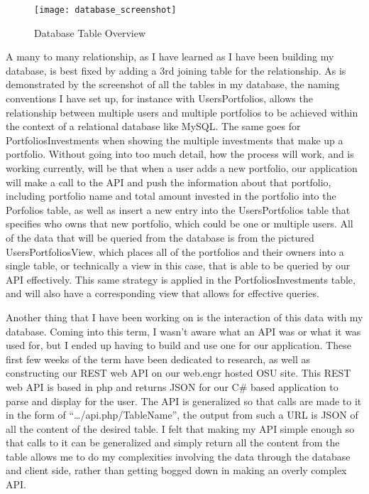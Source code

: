 \documentclass[letterpaper,10pt,titlepage,journal,compsoc,draftclsnofoot,onecolumn]{IEEEtran}
\begin{document}
\begin{figure}[h]
\caption{Database Table Overview}
\centering
\texttt{[image: database\_screenshot]}
\end{figure}
A many to many relationship, as I have learned as I have been building my database, is best fixed by adding a 3rd joining table for the relationship. As is demonstrated by the screenshot of all the tables in my database, the naming conventions I have set up, for instance with UsersPortfolios, allows the relationship between multiple users and multiple portfolios to be achieved within the context of a relational database like MySQL. The same goes for PortfoliosInvestments when showing the multiple investments that make up a portfolio. Without going into too much detail, how the process will work, and is working currently, will be that when a user adds a new portfolio, our application will make a call to the API and push the information about that portfolio, including portfolio name and total amount invested in the portfolio into the Porfolios table, as well as insert a new entry into the UsersPortfolios table that specifies who owns that new portfolio, which could be one or multiple users. All of the data that will be queried from the database is from the pictured UsersPortfoliosView, which places all of the portfolios and their owners into a single table, or technically a view in this case, that is able to be queried by our API effectively. This same strategy is applied in the PortfoliosInvestments table, and will also have a corresponding view that allows for effective queries.

Another thing that I have been working on is the interaction of this data with my database. Coming into this term, I wasn’t aware what an API was or what it was used for, but I ended up having to build and use one for our application. These first few weeks of the term have been dedicated to research, as well as constructing our REST web API on our web.engr hosted OSU site. This REST web API is based in php and returns JSON for our C\# based application to parse and display for the user.  The API is generalized so that calls are made to it in the form of “…/api.php/{TableName}”, the output from such a URL is JSON of all the content of the desired table. I felt that making my API simple enough so that calls to it can be generalized and simply return all the content from the table allows me to do my complexities involving the data  through the database and client side, rather than getting bogged down in making an overly complex API. 
\end{document}
